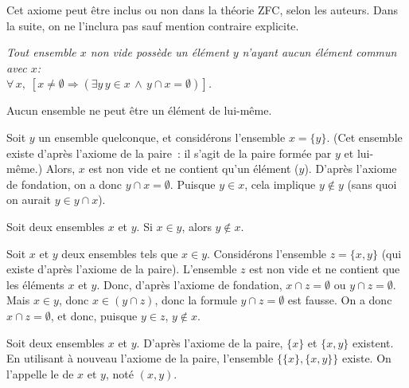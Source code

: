 \startsubsection[title=Axiome de fondation]

Cet axiome peut être inclus ou non dans la théorie ZFC, selon les auteurs. 
Dans la suite, on ne l'inclura pas sauf mention contraire explicite.

\blank[medium]

\noindent\emph{ Tout ensemble $x$ non vide possède un élément $y$ n'ayant aucun élément commun avec $x$: \\
$\forall \, x, \; \left[ x \neq \emptyset \Rightarrow (\exists y \, y \in x \, \wedge \, y \cap x = \emptyset) \right]$.} 

\blank[medium]

\noindent{} Aucun ensemble ne peut être un élément de lui-même. 

\blank[medium]

\noindent{} Soit $y$ un ensemble quelconque, et considérons l'ensemble $x = \lbrace y \rbrace$. 
(Cet ensemble existe d'après l'axiome de la paire : il s'agit de la paire formée par $y$ et lui-même.)
Alors, $x$ est non vide et ne contient qu'un élément ($y$). 
D'après l'axiome de fondation, on a donc $y \cap x = \emptyset$. 
Puisque $y \in x$, cela implique $y \notin y$ (sans quoi on aurait $y \in y \cap x$). 

\done

\blank[medium]

\noindent{} Soit deux ensembles $x$ et $y$. Si $x \in y$, alors $y \notin x$. 

\blank[medium]

\noindent{} Soit $x$ et $y$ deux ensembles tels que $x \in y$. 
Considérons l'ensemble $z = \lbrace x,y  \rbrace$ (qui existe d'après l'axiome de la paire). 
L'ensemble $z$ est non vide et ne contient que les éléments $x$ et $y$. 
Donc, d'après l'axiome de fondation, $x \cap z = \emptyset$ ou $y \cap z = \emptyset$. 
Mais $x \in y$, donc $x \in (y \cap z)$, donc la formule $y \cap z = \emptyset$ est fausse. 
On a donc $x \cap z = \emptyset$, et donc, puisque $y \in z$, $y \notin x$. 

\done

\stopsubsection

\startsubsection[title=Couples]

\noindent{} Soit deux ensembles $x$ et $y$. D'après l'axiome de la paire, $\lbrace x \rbrace$ et $\lbrace x, y \rbrace$ existent. En utilisant à nouveau l'axiome de la paire, l'ensemble $\lbrace \lbrace x \rbrace, \lbrace x, y \rbrace \rbrace$ existe. On l'appelle le \emph{} de $x$ et $y$, noté $(x,y)$.

